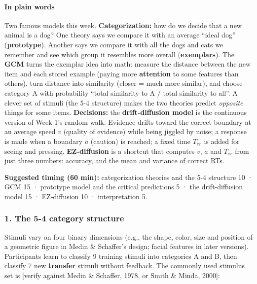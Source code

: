 \paragraph{In plain words}

Two famous models this week. \textbf{Categorization:} how do we decide
that a new animal is a dog? One theory says we compare it with an
average ``ideal dog'' (\textbf{prototype}). Another says we compare it
with all the dogs and cats we remember and see which group it resembles
more overall (\textbf{exemplars}). The \textbf{GCM} turns the exemplar
idea into math: measure the distance between the new item and each
stored example (paying more \textbf{attention} to some features than
others), turn distance into similarity (closer = much more similar), and
choose category A with probability ``total similarity to A / total
similarity to all''. A clever set of stimuli (the 5-4 structure) makes
the two theories predict \emph{opposite} things for some items.
\textbf{Decisions:} the \textbf{drift-diffusion model} is the continuous
version of Week 1's random walk. Evidence drifts toward the correct
boundary at an average speed \(v\) (quality of evidence) while being
jiggled by noise; a response is made when a boundary \(a\) (caution) is
reached; a fixed time \(T_{er}\) is added for seeing and pressing.
\textbf{EZ-diffusion} is a shortcut that computes \(v\), \(a\) and
\(T_{er}\) from just three numbers: accuracy, and the mean and variance
of correct RTs.

\textbf{Suggested timing (60 min):} categorization theories and the 5-4
structure 10 · GCM 15 · prototype model and the critical predictions 5 ·
the drift-diffusion model 15 · EZ-diffusion 10 · interpretation 5.

\subsubsection{1. The 5-4 category structure}

Stimuli vary on four binary dimensions (e.g., the shape, color, size and
position of a geometric figure in Medin \& Schaffer's design; facial
features in later versions). Participants learn to classify 9 training
stimuli into categories A and B, then classify 7 new \textbf{transfer}
stimuli without feedback. The commonly used stimulus set is {[}verify
against Medin \& Schaffer, 1978, or Smith \& Minda, 2000{]}:

